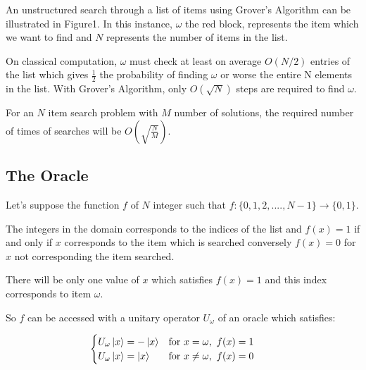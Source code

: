 \documentclass{article}
\begin{document}
\vspace{10mm}
\noindent
An unstructured search through a list of items using Grover's Algorithm can be illustrated in Figure1. In this instance, $\omega$ the red block, represents the item which we want to find and $N$ represents the number of items in the list. 
\vspace{5mm}

\noindent
On classical computation, $\omega$ must check at least on average $O(N/2)$ entries of the list which gives $\frac{1}{2}$ the probability of finding $\omega$ or worse the entire N elements in the list.
With Grover's Algorithm, only $O(\sqrt{N})$ steps are required to find $\omega$.
\vspace{5mm}

\noindent
For an $N$ item search problem with $M$ number of solutions, the required number of times of searches will be $O(\sqrt{\frac{N}{M}})$\cite{nielsen_quantum_2010}.
\pagebreak

\subsection{The Oracle}

Let's suppose the function $f$ of $N$ integer such that $f:\{0,1, 2,...., N-1\} \rightarrow{\{0,1\}}$. 
\vspace{5mm}

\noindent
The integers in the domain corresponds to the indices of the list and $f(x) =1$ if and only if $x$ corresponds to the item which is searched conversely $f(x) =0$ for $x$ not corresponding the item searched. 
\vspace{5mm}

\noindent
There will be only one value of $x$ which satisfies $f(x)=1$ and this index corresponds to item $\omega$\cite{noauthor_grovers_2022}.
\vspace{5mm}

\noindent
So $f$ can be accessed with a unitary operator $U_{\omega}$ of  an oracle which satisfies:
\vspace{5mm}

$\hspace{30mm} \begin{cases}
      U_{\omega}\ket{x} = -\ket{x}  & \text{for} \ x = \omega, \ f(x) =1 \\
       U_{\omega}\ket{x} = \ket{x}  & \text{for} \ x \neq \omega, \ f(x) = 0 \\
\end{cases}$
\vspace{5mm}
\end{document}
